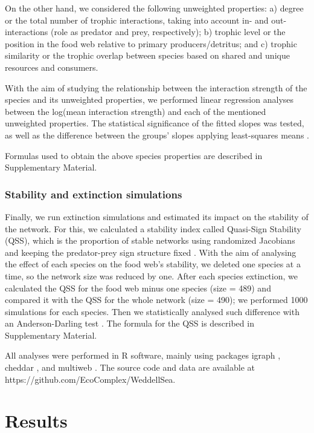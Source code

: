 \documentclass[gc, manuscript]{copernicus}
\begin{document}
On the other hand, we considered the following unweighted properties: a)
degree or the total number of trophic interactions, taking into account
in- and out-interactions (role as predator and prey, respectively); b)
trophic level or the position in the food web relative to primary
producers/detritus; and c) trophic similarity or the trophic overlap
between species based on shared and unique resources and consumers.

With the aim of studying the relationship between the interaction
strength of the species and its unweighted properties, we performed
linear regression analyses between the log(mean interaction strength)
and each of the mentioned unweighted properties. The statistical
significance of the fitted slopes was tested, as well as the difference
between the groups' slopes applying least-squares means
\citep{Harvey1960}.

Formulas used to obtain the above species properties are described in
Supplementary Material.

\subsubsection{Stability and extinction simulations}

Finally, we run extinction simulations and estimated its impact on the
stability of the network. For this, we calculated a stability index
called Quasi-Sign Stability (QSS), which is the proportion of stable
networks using randomized Jacobians and keeping the predator-prey sign
structure fixed \citep{Allesina2008}. With the aim of analysing the
effect of each species on the food web's stability, we deleted one
species at a time, so the network size was reduced by one. After each
species extinction, we calculated the QSS for the food web minus one
species (size = 489) and compared it with the QSS for the whole network
(size = 490); we performed 1000 simulations for each species. Then we
statistically analysed such difference with an Anderson-Darling test
\citep{Scholz1987}. The formula for the QSS is described in
Supplementary Material.

All analyses were performed in R software, mainly using packages igraph
\citep{Csardi2005}, cheddar \citep{Hudson2013}, and multiweb
\citep{Saravia2019}. The source code and data are available at
https://github.com/EcoComplex/WeddellSea.

\section{Results}
\end{document}
